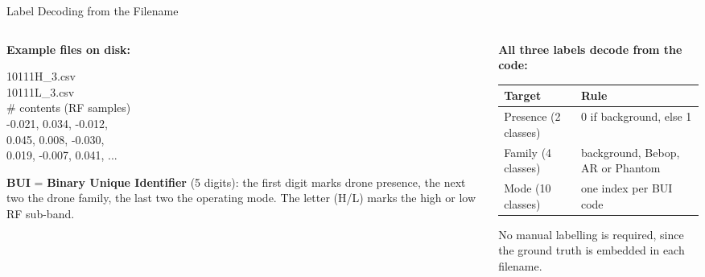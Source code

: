 \documentclass[aspectratio=169,11pt]{beamer}
\begin{document}
\begin{frame}{Label Decoding from the Filename}
\begin{columns}[t]
\begin{column}{0.46\textwidth}
\scriptsize
\textbf{Example files on disk:}
\vspace{0.1cm}

\colorbox{black!88}{\color{white}\ttfamily\scriptsize
\begin{minipage}{0.92\linewidth}
\vspace{2pt}
10111H\_3.csv\\
10111L\_3.csv\\[3pt]
\textcolor{green!60}{\# contents (RF samples)}\\
-0.021, 0.034, -0.012,\\
0.045, 0.008, -0.030,\\
0.019, -0.007, 0.041, ...
\vspace{2pt}
\end{minipage}}
\vspace{0.15cm}

\textbf{BUI} = \textbf{Binary Unique Identifier} (5 digits):
the first digit marks drone presence, the next two the drone family, the last
two the operating mode. The letter (H/L) marks the high or low RF sub-band.
\end{column}
\begin{column}{0.5\textwidth}
\scriptsize
\textbf{All three labels decode from the code:}
\vspace{0.15cm}

\begin{tabular}{|l|p{3.0cm}|}
\hline
\textbf{Target} & \textbf{Rule} \\
\hline
Presence (2 classes) & 0 if background, else 1 \\
\hline
Family (4 classes) & background, Bebop, AR or Phantom \\
\hline
Mode (10 classes) & one index per BUI code \\
\hline
\end{tabular}
\vspace{0.2cm}

\footnotesize No manual labelling is required, since the ground truth is
embedded in each filename.
\end{column}
\end{columns}
\end{frame}
\end{document}
